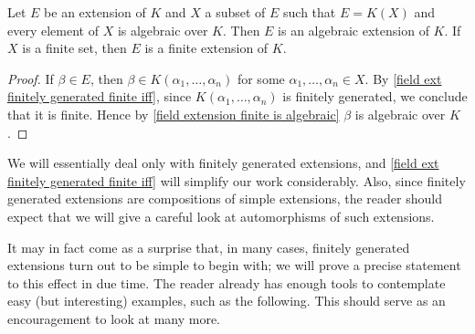 \begin{theorem}\label{field ext by algebraic elements is algebraic}
Let $E$ be an extension of $K$ and $X$ a subset of $E$ such that $E=K(X)$ and every element of $X$ is algebraic over $K$. Then $E$ is an algebraic extension of $K$. If $X$ is a finite set, then $E$ is a finite extension of $K$.
\end{theorem}
\begin{proof}
If $\beta\in E$, then $\beta\in K(\alpha_1,\dots,\alpha_n)$ for some $\alpha_1,\dots,\alpha_n\in X$. By \cref{field ext finitely generated finite iff}, since $K(\alpha_1,\dots,\alpha_n)$ is finitely generated, we conclude that it is finite. Hence by \cref{field extension finite is algebraic} $\beta$ is algebraic over $K$.
\end{proof}
We will essentially deal only with finitely generated extensions, and \cref{field ext finitely generated finite iff} will simplify our work considerably. Also, since finitely generated extensions are compositions of simple extensions, the reader should expect that we will
give a careful look at automorphisms of such extensions.\par
It may in fact come as a surprise that, in many cases, finitely generated extensions turn out to be simple to begin with; we will prove a precise statement to this effect in due time. The reader already has enough tools to contemplate easy (but interesting) examples, such as the following. This should serve as an encouragement to look at many more.
